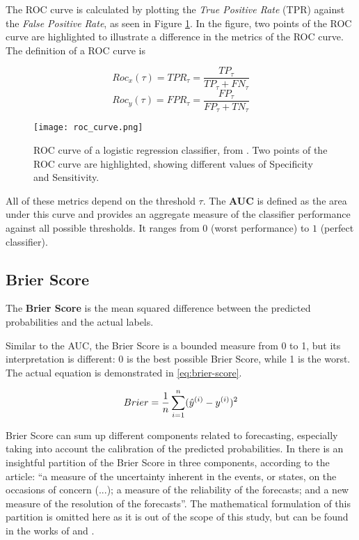 The ROC curve is calculated by plotting the \textit{True Positive Rate} (TPR) against the \textit{False Positive Rate}, as seen in Figure \ref{fig:auroc}. In the figure, two points of the ROC curve are highlighted to illustrate a difference in the metrics of the ROC curve. The definition of a ROC curve is

$$Roc_x(\tau) = TPR_{\tau} = \frac{TP_{\tau}}{TP_{\tau} + FN_{\tau}}$$
$$Roc_y(\tau) = FPR_{\tau} = \frac{FP_{\tau}}{FP_{\tau} + TN_{\tau}}$$

\begin{figure}[H]
    \centering
    \texttt{[image: roc\_curve.png]} 
    \caption{ROC curve of a logistic regression classifier, from \cite{kuhn2013applied}. Two points of the ROC curve are highlighted, showing different values of Specificity and Sensitivity.}
    \label{fig:auroc}
\end{figure}

\noindent All of these metrics depend on the threshold $\tau$. The \textbf{AUC} is defined as the area under this curve and provides an aggregate measure of the classifier performance against all possible thresholds. It ranges from $0$ (worst performance) to $1$ (perfect classifier).


\subsection{Brier Score}

The \textbf{Brier Score} is the mean squared difference between the predicted probabilities and the actual labels. 

Similar to the AUC, the Brier Score is a bounded measure from 0 to 1, but its interpretation is different: 0 is the best possible Brier Score, while 1 is the worst. The actual equation is demonstrated in \ref{eq:brier-score}.

\begin{equation}\label{eq:brier-score}
    Brier=\frac{1}{n}\sum_{i=1}^{n}(\hat{y}^{(i)} - y^{(i)})^2
\end{equation}

\noindent Brier Score can sum up different components related to forecasting, especially taking into account the calibration of the predicted probabilities. In \cite{murphy1973new} there is an insightful partition of the Brier Score in three components, according to the article: ``a measure of the uncertainty inherent in the events, or states, on the occasions of concern (...); a measure of the reliability of the forecasts; and  a new measure of the resolution of the forecasts''. The mathematical formulation of this partition is omitted here as it is out of the scope of this study, but can be found in the works of \cite{rufibach2010use} and \cite{murphy1973new}.

